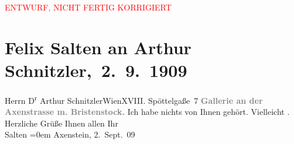 
\begin{center}
            \textcolor{red}{ENTWURF, NICHT FERTIG KORRIGIERT}
                      \end{center}
            
         \renewcommand{\erwaehnteOrte}{Orte: Axenstein, Axenstraße, Bristen, Edmund-Weiß-Gasse 7, Morschach, Salzburg, Wien}
         \renewcommand{\erwaehnteWerke}{}
               \section[ Felix Salten an Arthur Schnitzler, 2. 9. 1909]{ Felix Salten an Arthur Schnitzler, 2. 9. 1909}\nopagebreak{}\rehead{ }\begin{ledgroupsized}[t]{13cm}\normalsize\beginnumbering \toendnotes[C]{\smallbreak\pagebreak[2]} 
\toendnotes[C]{\smallbreak}\pstart{}{\pb}Herrn D\textsuperscript{r} Arthur Schnitzler\pend{}\pstart{}Wien\pend{}\pstart{}XVIII. Spöttelgaße 7\pend{}{\bigskip}\pstart
           \noindent{}\centering{}{\pb}\textcolor{gray}{\textbf{Gallerie an der Axenstrasse m. Bristenstock.}}\pend
           \pstart
           {\pb}Ich habe nichts von Ihnen
               gehört. Vielleicht \label{K_L03508-1v}\label{K_L03508-1h}. Herzliche Grüße Ihnen allen\pend
           \pstart
           Ihr {\\[\baselineskip]}\spacefill\mbox{Salten}\pend
           \leftskip=0em{}\pstart
           Axenstein, 2. Sept. 09\pend
           
         
         \endnumbering{}\end{ledgroupsized}  \newcommand{\dateiname}{L03508}\newcommand{\titel}{Felix Salten an Arthur Schnitzler, 2. 9. 1909}\newcommand{\editorInnen}{Martin Anton Müller und Laura Untner}
      